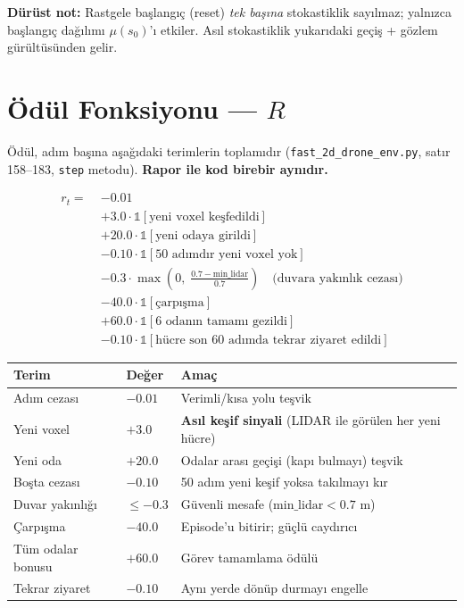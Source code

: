 \documentclass[11pt,a4paper]{article}
\begin{document}
\noindent\textbf{Dürüst not:} Rastgele başlangıç (reset) \emph{tek başına}
stokastiklik sayılmaz; yalnızca başlangıç dağılımı $\mu(s_0)$'ı etkiler. Asıl
stokastiklik yukarıdaki geçiş + gözlem gürültüsünden gelir.

\section{Ödül Fonksiyonu --- $R$}
Ödül, adım başına aşağıdaki terimlerin toplamıdır (\texttt{fast\_2d\_drone\_env.py},
satır 158--183, \texttt{step} metodu). \textbf{Rapor ile kod birebir aynıdır.}

\begin{align*}
r_t = \;& -0.01 \\
      & + 3.0 \cdot \mathbb{1}[\text{yeni voxel keşfedildi}] \\
      & + 20.0 \cdot \mathbb{1}[\text{yeni odaya girildi}] \\
      & - 0.10 \cdot \mathbb{1}[\text{50 adımdır yeni voxel yok}] \\
      & - 0.3 \cdot \max\!\left(0,\; \tfrac{0.7 - \text{min\_lidar}}{0.7}\right)
        \quad \text{(duvara yakınlık cezası)} \\
      & - 40.0 \cdot \mathbb{1}[\text{çarpışma}] \\
      & + 60.0 \cdot \mathbb{1}[\text{6 odanın tamamı gezildi}] \\
      & - 0.10 \cdot \mathbb{1}[\text{hücre son 60 adımda tekrar ziyaret edildi}]
\end{align*}

\begin{center}
\begin{tabular}{lll}
\toprule
\textbf{Terim} & \textbf{Değer} & \textbf{Amaç} \\
\midrule
Adım cezası & $-0.01$ & Verimli/kısa yolu teşvik \\
Yeni voxel & $+3.0$ & \textbf{Asıl keşif sinyali} (LIDAR ile görülen her yeni hücre) \\
Yeni oda & $+20.0$ & Odalar arası geçişi (kapı bulmayı) teşvik \\
Boşta cezası & $-0.10$ & 50 adım yeni keşif yoksa takılmayı kır \\
Duvar yakınlığı & $\le -0.3$ & Güvenli mesafe ($\text{min\_lidar} < 0.7$ m) \\
Çarpışma & $-40.0$ & Episode'u bitirir; güçlü caydırıcı \\
Tüm odalar bonusu & $+60.0$ & Görev tamamlama ödülü \\
Tekrar ziyaret & $-0.10$ & Aynı yerde dönüp durmayı engelle \\
\bottomrule
\end{tabular}
\end{center}
\end{document}
